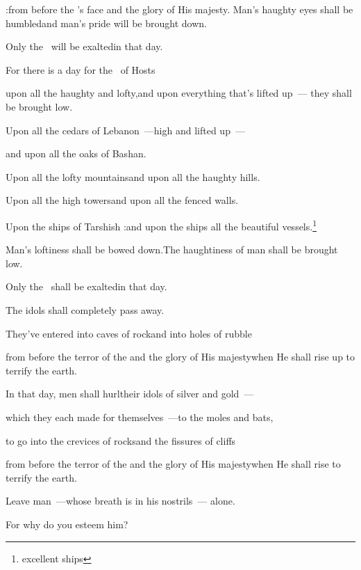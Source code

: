 \begin{inparaenum}
  :from before the \lord's face and the glory of His majesty.
  \pb{} Man's haughty eyes shall be humbled\pa{}and man's pride will be brought down.%

  \pa{}Only the \lord\ will be exalted\pa{}in that day.%

  \pa{} For there is a day for the \lord\ of Hosts%

  \pa{}upon all the haughty and lofty,\pa{}and upon everything that's lifted up~--- they shall be brought low.%

  \pa{} Upon all the cedars of Lebanon~---\pa{}high and lifted up~---%

  \pa{}and upon all the oaks of Bashan.%

  \pa{} Upon all the lofty mountains\pa{}and upon all the haughty hills.%

  \pa{} Upon all the high towers\pa{}and upon all the fenced walls.%

   Upon the ships of Tarshish :and upon the ships all the beautiful vessels.\footnote{excellent ships}%

  \pa{} Man's loftiness shall be bowed down.\pa{}The haughtiness of man shall be brought low.%

  \pa{}Only the \lord\ shall be exalted\pa{}in that day.%

  \pb{} The idols shall completely pass away.%

  \pa{} They've entered into caves of rock\pa{}and into holes of rubble%

  \pa{}from before the terror of the \lord\pa{}and the glory of His majesty\pa{}when He shall rise up to terrify the earth.%

  \pa{} In that day, men shall hurl\pa{}their idols of silver and gold~---%

  \pa{}which they each made for themselves~---\pa{}to the moles and bats,%

  \pa{} to go into the crevices of rocks\pa{}and the fissures of cliffs%

  \pa{}from before the terror of the \lord\pa{}and the glory of His majesty\pa{}when He shall rise to terrify the earth.%

  \pc{} Leave man~---\pa{}whose breath is in his nostrils~--- alone.%

  \pc{}For why do you esteem him?%
\end{inparaenum}
